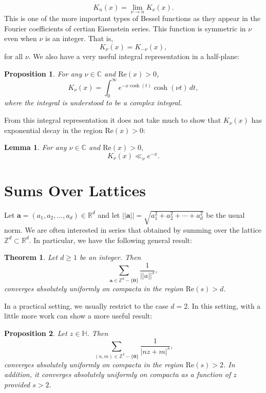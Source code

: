 \documentclass[12pt]{book}
\newtheorem{theorem}{Theorem}[section]
\newtheorem{proposition}{Proposition}[section]
\newtheorem{lemma}{Lemma}[section]
\theoremstyle{definition}\newframedtheorem{method}{Method}
\newcommand{\Z}{\mathbb{Z}}
\newcommand{\R}{\mathbb{R}}
\newcommand{\C}{\mathbb{C}}
\renewcommand{\H}{\mathbb{H}}
\newcommand{\<}{\langle}
\renewcommand{\>}{\rangle}
\renewcommand{\Re}{\mathrm{Re}}
\begin{document}
    \[
      K_{n}(x)= \lim_{\nu \to n}K_{\nu}(x).
    \]
    This is one of the more important types of Bessel functions as they appear in the Fourier coefficients of certian Eisenstein series. This function is symmetric in $\nu$ even when $\nu$ is an integer. That is,
    \[
      K_{\nu}(x) = K_{-\nu}(x),
    \]
    for all $\nu$. We also have a very useful integral representation in a half-plane:
    \begin{proposition}\label{prop:integral_representation_K-Bessel_function}
      For any $\nu \in \C$ and $\Re(x) > 0$,
      \[
        K_{\nu}(x) = \int_{0}^{\infty}e^{-x\cosh(t)}\cosh(\nu t)\,dt,
      \]
      where the integral is understood to be a complex integral.
    \end{proposition}
    From this integral representation it does not take much to show that $K_{\nu}(x)$ has exponential decay in the region $\Re(x) > 0$:
    \begin{lemma}\label{lem:exponential_decay_K-Bessel_function}
      For any $\nu \in \C$ and $\Re(x) > 0$,
      \[
        K_{\nu}(x) \ll_{\nu} e^{-x}.
      \]
    \end{lemma}
  \section{Sums Over Lattices}
    Let $\mathbf{a} = (a_{1},a_{2},\ldots,a_{d}) \in \R^{d}$ and let $||\mathbf{a}|| = \sqrt{a_{1}^{2}+a_{2}^{2}+\cdots+a_{d}^{2}}$ be the usual norm. We are often interested in series that obtained by summing over the lattice $\Z^{d} \subset \R^{d}$. In particular, we have the following general result:

    \begin{theorem}
      Let $d \ge 1$ be an integer. Then
      \[
        \sum_{\mathbf{a} \in \Z^{d}-\{\mathbf{0}\}}\frac{1}{||a||^{s}},
      \]
      converges absolutely uniformly on compacta in the region $\Re(s) > d$.
    \end{theorem}

    In a practical setting, we usually restrict to the case $d = 2$. In this setting, with a little more work can show a more useful result:

    \begin{proposition}\label{prop:general_lattice_sum_convergence_for_two_variables}
      Let $z \in \H$. Then
      \[
        \sum_{(n,m) \in \Z^{2}-\{\mathbf{0}\}}\frac{1}{|nz+m|^{s}},
      \]
      converges absolutely uniformly on compacta in the region $\Re(s) > 2$. In addition, it converges absolutely uniformly on compacta as a function of $z$ provided $s > 2$.
    \end{proposition}
\end{document}
